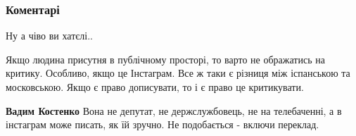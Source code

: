  
 
 
 
 
\subsubsection{Коментарі}
\label{sec:29_07_2021.fb.malanjuk_lesja.1.bilodid_darja_jazyk_semja.cmt}

\begin{itemize}
 
Ну а чіво ви хатєлі..\Laughey[1.0][white]

 

Якщо людина присутня в публічному просторі, то варто не ображатись на критику.
Особливо, якщо це Інстаграм. Все ж таки є різниця між іспанською та
московською. Якщо є право дописувати, то і є право це критикувати.

\begin{itemize}
 
\textbf{Вадим Костенко} Вона не депутат, не держслужбовець, не на телебаченні,
а в інстаграм може писать, як їй зручно. Не подобається - включи переклад.

\begin{itemize}
 

\end{itemize}
\end{itemize}
\end{itemize}
